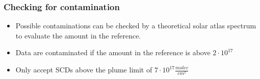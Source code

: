 \documentclass{beamer} %
\begin{document}
		\begin{frame}
			\frametitle{\color{mygreen} Checking for contamination\\%
				\color{mygreen}{\rule{0.8\textwidth}{2pt}}}
			\vspace{-0.2cm}
			\begin{itemize}
				\item Possible contaminations can be checked
				by a theoretical solar atlas spectrum to evaluate the  amount in the reference.
				\item Data are contaminated if the  amount in the reference is above $2\cdot 10^{17}$ 
				\item Only accept  SCDs above the plume limit of $7\cdot 10^{17} \frac{molec}{cm^2}$
			\end{itemize}
		\end{frame}
		
\end{document}
